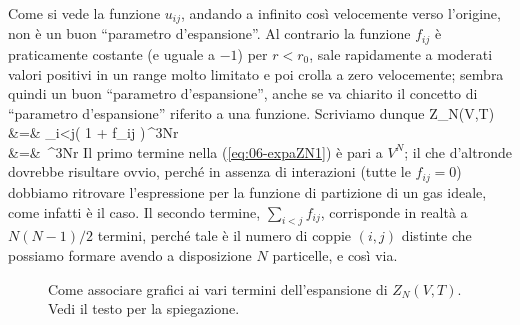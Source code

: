 Come si vede la funzione $u_{ij}$, andando a infinito così velocemente verso l'origine, non è un buon ``parametro d'espansione''. Al contrario la funzione $f_{ij}$ è praticamente costante (e uguale a $-1$) per $r < r_0$, sale rapidamente a moderati valori positivi in un range molto limitato e poi crolla a zero velocemente; sembra quindi un buon ``parametro d'espansione'', anche se va chiarito il concetto di ``parametro d'espansione'' riferito a una funzione.
Scriviamo dunque
\bea
\label{eq:06-expaZN1}
Z_N(V,T) &=& \int \prod_{i<j}\left( 1 + f_{ij} \right)\,\de^{3N}r \nonumber \\
&=& \int {}\,\de^{3N}r
\eea
Il primo termine nella (\ref{eq:06-expaZN1}) è pari a $V^N$; il che d'altronde dovrebbe risultare ovvio, perché in assenza di interazioni (tutte le $f_{ij} = 0$) dobbiamo ritrovare l'espressione per la funzione di partizione di un gas ideale, come infatti è il caso. Il secondo termine, $\sum_{i<j} f_{ij}$, corrisponde in realtà a $N(N-1)/2$ termini, perché tale è il numero di coppie $(i,j)$ distinte che possiamo formare avendo a disposizione $N$ particelle, e così via.

\begin{figure}[h]
  \centering
  
  \caption{Come associare grafici ai vari termini dell'espansione di $Z_N(V,T)$. Vedi il testo per la spiegazione.}
  \label{fig:06-graph1}
\end{figure}

